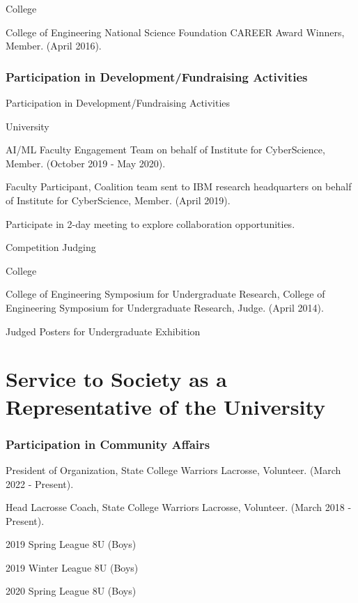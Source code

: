 \documentclass[a4paper,10pt]{article}
\begin{document}
College

College of Engineering National Science Foundation CAREER Award Winners, Member. (April 2016).

\hspace{1cm}\subsubsection*{Participation in Development/Fundraising Activities}

Participation in Development/Fundraising Activities

University

AI/ML Faculty Engagement Team on behalf of Institute for CyberScience, Member. (October 2019 - May 2020).

Faculty Participant, Coalition team sent to IBM research headquarters on behalf of Institute for CyberScience, Member. (April 2019).

Participate in 2-day meeting to explore collaboration opportunities.

Competition Judging

College

College of Engineering Symposium for Undergraduate Research, College of Engineering Symposium for Undergraduate Research, Judge. (April 2014).

Judged Posters for Undergraduate Exhibition
\section*{Service to Society as a Representative of the University}

\subsubsection*{Participation in Community Affairs}

\hspace{1cm}President of Organization, State College Warriors Lacrosse, Volunteer. (March 2022 - Present).

\hspace{1cm}Head Lacrosse Coach, State College Warriors Lacrosse, Volunteer. (March 2018 - Present).

\hspace{1cm}2019 Spring League 8U (Boys)

\hspace{1cm}2019 Winter League 8U (Boys)

\hspace{1cm}2020 Spring League 8U (Boys)
\end{document}
